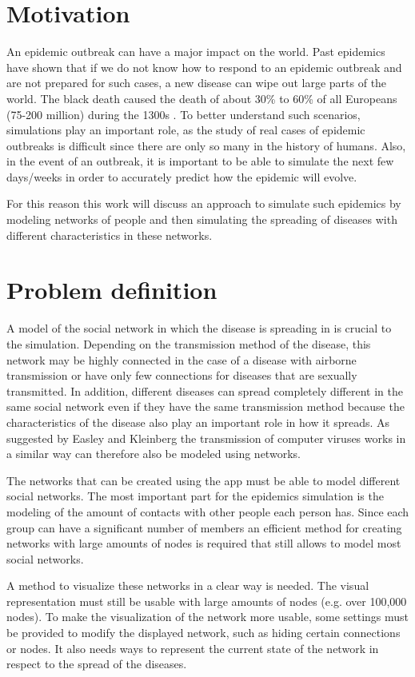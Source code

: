 \section{Motivation}
An epidemic outbreak can have a major impact on the world. Past epidemics have shown that
if we do not know how to respond to an epidemic outbreak and are not prepared for 
such cases, a new disease can wipe out large parts of the world. The black
death caused the death of about 30\% to 60\% of all Europeans (75-200 million)
during the 1300s \cite{blackDeath}.
To better understand such scenarios, simulations play an important role, as the study of real
cases of epidemic outbreaks is difficult since there are only so many in the history of humans.
Also, in the event of an outbreak, it is important to be able to simulate the next few days/weeks
in order to accurately predict how the epidemic will evolve.

For this reason this work will discuss an approach to simulate such epidemics by modeling
networks of people and then simulating the spreading of diseases with different characteristics
in these networks.

\section{Problem definition}
A model of the social network in which the disease is spreading in is crucial to the simulation.
Depending on the transmission method of the disease, this network may be highly connected in 
the case of a disease with airborne transmission or have only few connections for diseases
that are sexually transmitted. In addition, different diseases can spread
completely different in the same social network even if they have the same transmission method
because the characteristics of the disease also play an important role in how it spreads. 
As suggested by Easley and Kleinberg \cite{networks}
the transmission of computer viruses works in a similar way can therefore also be modeled
using networks.

The networks that can be created using the app must be able to model different social
networks. The most important part for the epidemics simulation is the modeling of the amount
of contacts with other people each person has. Since each group can have a significant number
of members an efficient method for creating networks with large amounts of nodes is required that
still allows to model most social networks.

A method to visualize these networks in a clear way is needed. The visual 
representation must still be usable with large amounts of nodes (e.g. over 100,000 nodes).
To make the visualization of the network more usable, some settings must be provided
to modify the displayed network, such as hiding certain connections or nodes. It also needs
ways to represent the current state of the network in respect to the spread of the diseases.

